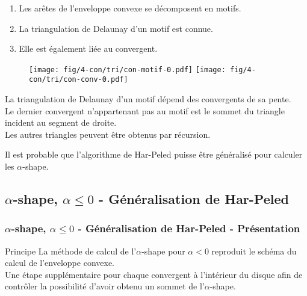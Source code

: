 \begin{frame}
{}
{
  \begin{block}{}
	  \begin{enumerate}
		\item Les arêtes de l'enveloppe convexe se décomposent en motifs.
		\item La triangulation de Delaunay d'un motif est connue.
		\item Elle est également liée au convergent.
	  \end{enumerate}
  \end{block}
}
{
	\begin{figure}[H]
	  \centering
	  \texttt{[image: fig/4-con/tri/con-motif-0.pdf]}
	  \texttt{[image: fig/4-con/tri/con-conv-0.pdf]}
	\end{figure}
}
{
  \begin{block}{}
    La triangulation de Delaunay d'un motif dépend des convergents de sa pente.\\
	  Le dernier convergent n'appartenant pas au motif est le sommet du triangle incident au segment de droite.\\
	  Les autres triangles peuvent être obtenus par récursion.\\
  \end{block}
}



{
	\begin{alertblock}{}
	  Il est probable que l'algorithme de Har-Peled puisse être généralisé pour calculer les $\alpha$-shape.
	\end{alertblock}
}
\end{frame}


\subsection{$\alpha$-shape, $\alpha \leq 0$ - Généralisation de Har-Peled}

\begin{frame}
\frametitle{$\alpha$-shape, $\alpha \leq 0$ - Généralisation de Har-Peled - Présentation}

\begin{block}{Principe}
  La méthode de calcul de l'$\alpha$-shape pour $\alpha <0$ reproduit le schéma du calcul de l’enveloppe convexe.\\ 
  Une étape supplémentaire pour chaque convergent à l'intérieur du disque afin de contrôler la possibilité d'avoir obtenu un sommet de l'$\alpha$-shape.

\end{block}

\end{frame}

